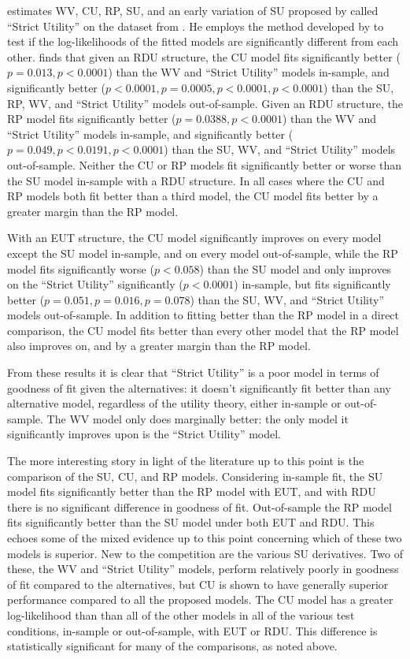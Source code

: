 \documentclass[../main.tex]{subfiles}
\begin{document}
\textcite{Wilcox2008} estimates WV, CU, RP, SU, and an early variation of SU proposed by \textcite{Luce1958} called \enquote{Strict Utility} on the dataset from \textcite{Hey2001}.
He employs the  method developed by \textcite{Vuong1989} to test if the log-likelihoods of the fitted models are significantly different from each other.
\textcite[273]{Wilcox2008} finds that given an RDU structure, the CU model fits significantly better ($p=0.013,p<0.0001$) than the WV and \enquote{Strict Utility} models in-sample, and significantly better ($p<0.0001, p=0.0005, p<0.0001, p<0.0001$) than the SU, RP, WV, and \enquote{Strict Utility} models out-of-sample.
Given an RDU structure, the RP model fits significantly better ($p=0.0388,p<0.0001$) than the WV and \enquote{Strict Utility} models in-sample, and significantly better ($p=0.049, p<0.0191, p<0.0001$) than the SU, WV, and \enquote{Strict Utility} models out-of-sample.
Neither the CU or RP models fit significantly better or worse than the SU model in-sample with a RDU structure.
In all cases where the CU and RP models both fit better than a third model, the CU model fits better by a greater margin than the RP model.

With an EUT structure, the CU model significantly improves on every model except the SU model in-sample, and on every model out-of-sample, while the RP model fits significantly worse ($p<0.058$) than the SU model and only improves on the \enquote{Strict Utility} significantly ($p<0.0001$) in-sample, but fits significantly better ($p=0.051,p=0.016,p=0.078$) than the SU, WV, and \enquote{Strict Utility} models out-of-sample.
In addition to fitting better than the RP model in a direct comparison, the CU model fits better than every other model that the RP model also improves on, and by a greater margin than the RP model.

From these results it is clear that \enquote{Strict Utility} is a poor model in terms of goodness of fit given the alternatives: it doesn't significantly fit better than any alternative model, regardless of the utility theory, either in-sample or out-of-sample.
The WV model only does marginally better: the only model it significantly improves upon is the \enquote{Strict Utility} model.

The more interesting story in light of the literature up to this point is the comparison of the SU, CU, and RP models.
Considering in-sample fit, the SU model fits significantly better than the RP model with EUT, and with RDU there is no significant difference in goodness of fit.
Out-of-sample the RP model fits  significantly better than the SU model under both EUT and RDU.
This echoes some of the mixed evidence up to this point concerning which of these two models is superior.
New to the competition are the various SU derivatives.
Two of these, the WV and \enquote{Strict Utility} models, perform relatively poorly in goodness of fit compared to the alternatives, but CU is shown to have generally superior performance compared to all the proposed models.
The CU model has a greater log-likelihood than than all of the other models in all of the various test conditions, in-sample or out-of-sample, with EUT or RDU.
This difference is statistically significant for many of the comparisons, as noted above.
\end{document}
